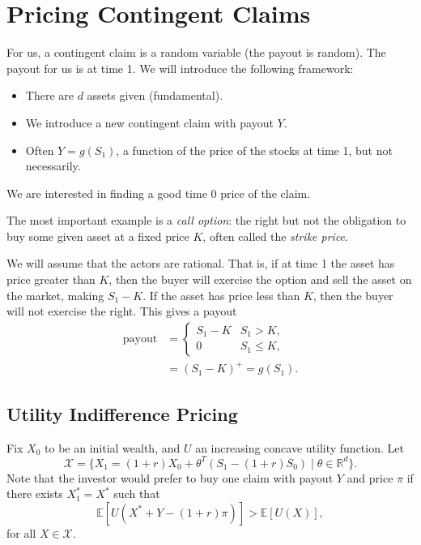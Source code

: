 \documentclass[12pt]{article}
\begin{document}
\section{Pricing Contingent Claims}
\label{sec:price_cont}

For us, a contingent claim is a random variable (the payout is random). The payout for us is at time 1. We will introduce the following framework:
\begin{itemize}
	\item There are $d$ assets given (fundamental).
	\item We introduce a new contingent claim with payout $Y$.
	\item Often $Y = g(S_1)$, a function of the price of the stocks at time 1, but not necessarily.
\end{itemize}
We are interested in finding a good time $0$ price of the claim.

The most important example is a \emph{call option}: the right but not the obligation to buy some given asset at a fixed price $K$, often called the \emph{strike price}.

We will assume that the actors are rational. That is, if at time 1 the asset has price greater than $K$, then the buyer will exercise the option and sell the asset on the market, making $S_1 - K$. If the asset has price less than $K$, then the buyer will not exercise the right. This gives a payout
\begin{align*}
	\text{payout} &= 
	\begin{cases}
		S_1 - K & S_1 > K,\\
		0 & S_1 \leq K,
	\end{cases}
	\\
		      &= (S_1-K)^{+} = g(S_1).
\end{align*}

\subsection{Utility Indifference Pricing}
\label{sub:u_price}

Fix $X_0$ to be an initial wealth, and $U$ an increasing concave utility function. Let
\[
	\mathcal{X} = \{X_1 = (1+r)X_0 + \theta^{T}(S_1 - (1+r)S_0) \mid \theta \in \mathbb{R}^{d} \}.
\]
Note that the investor would prefer to buy one claim with payout $Y$ and price $\pi$ if there exists $X_1^{\ast} = X^{\ast}$ such that
\[
\mathbb{E}[U(X^{\ast} + Y - (1+r)\pi)] > \mathbb{E}[U(X)],
\]
for all $X \in \mathcal{X}$.
\end{document}
